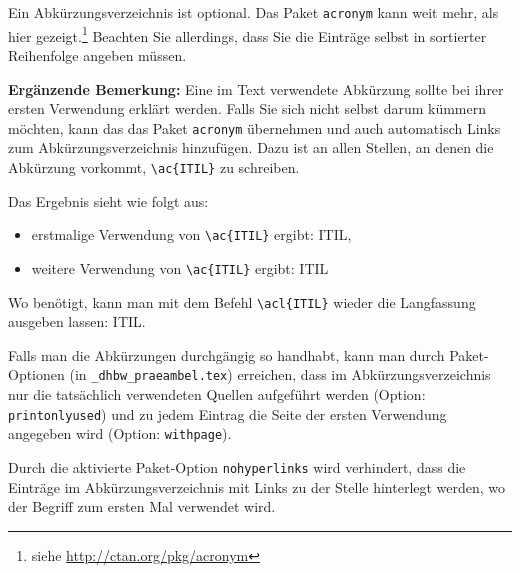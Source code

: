 \startAbkVerzeichnis

Ein Abkürzungsverzeichnis ist optional. Das Paket \verb|acronym| kann weit mehr, als hier gezeigt.\footnote{siehe \url{http://ctan.org/pkg/acronym}}
Beachten Sie allerdings, dass Sie die Einträge selbst in sortierter Reihenfolge angeben müssen.

\begin{acronym}[DHBW] 
\end{acronym}

\vspace{2em}
{\footnotesize
\textbf{Ergänzende Bemerkung:}
Eine im Text verwendete Abkürzung sollte bei ihrer ersten Verwendung erklärt werden. Falls Sie sich nicht selbst darum kümmern möchten, kann das das Paket \verb|acronym| übernehmen und auch automatisch Links zum Abkürzungsverzeichnis hinzufügen. Dazu ist an allen Stellen, an denen die Abkürzung vorkommt, \verb|\ac{ITIL}| zu schreiben. 

Das Ergebnis sieht wie folgt aus: 
\begin{itemize}
\item erstmalige Verwendung von \verb|\ac{ITIL}| ergibt: \ac{ITIL},
\item weitere Verwendung von \verb|\ac{ITIL}| ergibt: \ac{ITIL}
\end{itemize}
Wo benötigt, kann man mit dem Befehl \verb|\acl{ITIL}| wieder die Langfassung ausgeben lassen: \acl{ITIL}.

Falls man die Abkürzungen durchgängig so handhabt, kann man durch Paket-Optionen (in \verb|_dhbw_praeambel.tex|)
erreichen, dass im Abkürzungsverzeichnis nur die tatsächlich verwendeten Quellen aufgeführt werden (Option: \verb|printonlyused|) und zu jedem Eintrag die Seite der ersten Verwendung angegeben wird (Option: \verb|withpage|).

Durch die aktivierte Paket-Option \verb|nohyperlinks| wird verhindert, dass die Einträge im Abkürzungsverzeichnis mit Links zu der Stelle hinterlegt werden, wo der Begriff zum ersten Mal verwendet wird.}